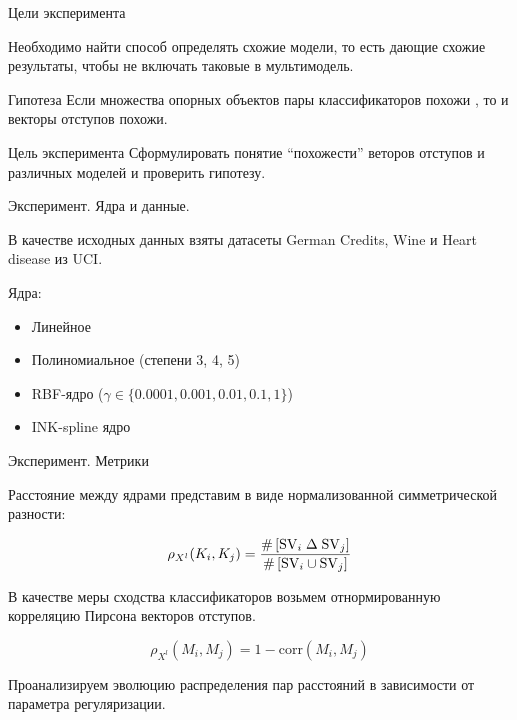 \documentclass{beamer}
\begin{document}
\begin{frame}{Цели эксперимента}

Необходимо найти способ определять схожие модели, то есть дающие схожие результаты, 
 чтобы не включать таковые в мультимодель. 

\begin{block}{Гипотеза}
    Если множества опорных объектов пары классификаторов похожи
    , то и векторы отступов похожи.
\end{block}

\begin{block}{Цель эксперимента}
    Сформулировать понятие ``похожести'' веторов отступов
    и различных моделей и проверить гипотезу.
\end{block}



\end{frame}
\begin{frame}{Эксперимент. Ядра и данные.}

В качестве исходных данных взяты датасеты German Credits, Wine и Heart disease из UCI.

Ядра:

\begin{itemize}
    \item Линейное
    \item Полиномиальное (степени 3, 4, 5)
    \item RBF-ядро ($\gamma \in \{0.0001, 0.001, 0.01, 0.1, 1\}$)
    \item {\color{red} INK-spline ядро}
\end{itemize}

    
\end{frame}
\begin{frame}{Эксперимент. Метрики}

Расстояние между ядрами представим в виде нормализованной симметрической разности:

\begin{block}{}
    $$
\rho_{X^l}(K_i, K_j) = \frac{\#\left[\mathrm{SV}_i \;\Delta\; \mathrm{SV}_j\right]}
{\#\left[\mathrm{SV}_i \cup \mathrm{SV}_j\right]}
    $$
\end{block}

В качестве меры сходства классификаторов возьмем отнормированную корреляцию Пирсона векторов отступов.

\begin{block}{}
    $$
\rho_{X^l}(M_i, M_j) = 1 - \mathrm{corr}(M_i, M_j)
    $$
\end{block}

Проанализируем эволюцию распределения пар расстояний в зависимости от параметра регуляризации.
    
\end{frame}
\end{document}
